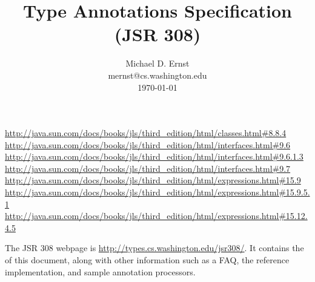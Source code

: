\documentclass[10pt]{article}
\title{Type Annotations Specification (JSR 308)}
\author{Michael D. Ernst \\
{\ttfamily mernst@cs.washington.edu} \\
\today
}
\begin{document}
\def\codesize{\smaller}
\newcommand{\code}[1]{\ifmmode{\mbox{\codesize\ttfamily{#1}}}\else{\codesize\ttfamily #1}\fi}
\def\<#1>{\code{#1}}
\newcommand{\myurl}[1]{{\codesize\url{#1}}}




\makeatletter
\def\topfigrule{\kern3\p@ \hrule \kern -3.4\p@} %
\def\botfigrule{\kern-3\p@ \hrule \kern 2.6\p@} %
\def\dblfigrule{\kern3\p@ \hrule \kern -3.4\p@} %
\makeatother


\newcommand{\jlsURL}{http://java.sun.com/docs/books/jls/third_edition/html/}
\urldef{\jlsEightEightFourURL}\url{http://java.sun.com/docs/books/jls/third_edition/html/classes.html#8.8.4}
\urldef{\jlsNineSixURL}\url{http://java.sun.com/docs/books/jls/third_edition/html/interfaces.html#9.6}
\urldef{\jlsNineSixOneThreeURL}\url{http://java.sun.com/docs/books/jls/third_edition/html/interfaces.html#9.6.1.3}
\urldef{\jlsNineSevenURL}\url{http://java.sun.com/docs/books/jls/third_edition/html/interfaces.html#9.7}
\urldef{\jlsFifteenNine}\url{http://java.sun.com/docs/books/jls/third_edition/html/expressions.html#15.9}
\urldef{\jlsFifteenNineFiveOneURL}\url{http://java.sun.com/docs/books/jls/third_edition/html/expressions.html#15.9.5.1}
\urldef{\jlsFifteenTwelveFourFiveURL}\url{http://java.sun.com/docs/books/jls/third_edition/html/expressions.html#15.12.4.5}



\maketitle

The JSR 308 webpage is \myurl{http://types.cs.washington.edu/jsr308/}.
It contains the
of this document, along
with other information such as a FAQ, the reference implementation, and
sample annotation processors.

\end{document}
